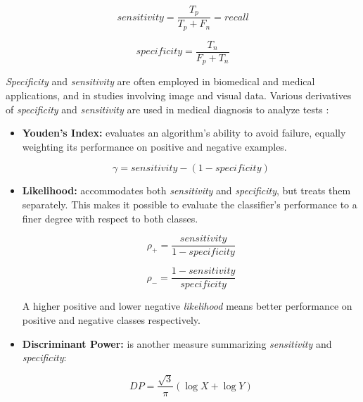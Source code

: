 \documentclass[10pt]{unbthesis}
\begin{document}
\begin{equation}
\label{equ:sensitivity}
sensitivity = \frac{T_p}{T_p + F_n}= recall
\end{equation}

\begin{equation}
\label{equ:recall}
specificity = \frac{T_n}{F_p + T_n}
\end{equation}

\textit{Specificity} and \textit{sensitivity} are often employed in
biomedical and medical applications, and in studies involving image and
visual data. Various derivatives of \textit{specificity} and
\textit{sensitivity} are used in medical diagnosis to analyze tests \cite{RefWorks:37}:

\begin{itemize}
  \item \textbf{Youden's Index:} evaluates an algorithm's ability to
    avoid failure, equally weighting its performance on positive and
    negative examples.

    \begin{equation}
      \label{equ:youden}
      \gamma = sensitivity - (1 - specificity)
    \end{equation}
    
    \item \textbf{Likelihood:} accommodates both \textit{sensitivity}
      and \textit{specificity}, but treats them separately. This makes
      it possible to evaluate the classifier's performance to a finer
      degree with respect to both classes. 

      \begin{equation}
        \label{equ:likelihoodp}
        \rho_+ = \frac{sensitivity}{1 - specificity}
      \end{equation}

      \begin{equation}
        \label{equ:likelihoodn}
        \rho_- = \frac{1 - sensitivity}{specificity}
      \end{equation}

      A higher positive and lower negative \textit{likelihood} means
      better performance on positive and negative classes
      respectively. 

      \item \textbf{Discriminant Power:} is another measure
        summarizing \textit{sensitivity} and \textit{specificity}:

        \begin{equation}
          \label{equ:dp}
          DP = \frac{\sqrt{3}}{\pi}(\log{X} + \log{Y})
        \end{equation}


\end{itemize}
\end{document}
